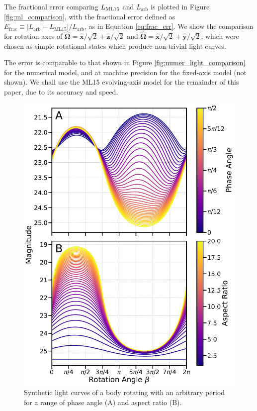 \documentclass[twocolumn,doublespacing]{aastex631}
\begin{document}
The fractional error comparing $L_{{\rm ML15}}$ and $L_\text{arb}$ is plotted in Figure \ref{fig:ml_comparison}, with the fractional error defined as $E_\text{frac}\equiv|L_\text{arb}-L_\text{ML15}|/L_\text{arb}$, as in Equation \ref{eq:frac_err}. We show the comparison for rotation axes of $\boldsymbol{\hat{\Omega}}=\boldsymbol{\hat{x}}/\sqrt{2}+\boldsymbol{\hat{z}}/\sqrt{2}$ and $\boldsymbol{\hat{\Omega}}=\boldsymbol{\hat{x}}/\sqrt{2}+\boldsymbol{\hat{y}}/\sqrt{2}$, which were chosen as simple rotational states which produce non-trivial light curves.

The error is comparable to that shown in Figure \ref{fig:numer_light_comparison} for the numerical model, and at machine precision for the fixed-axis model (not shown). We shall use the ML15 evolving-axis model for the remainder of this paper, due to its accuracy and speed.

\begin{figure}
\centering
\includegraphics[width=\linewidth,angle=0]{ML15_dependence_effects.pdf}
\caption{Synthetic light curves of a body rotating with an arbitrary period for a range of phase angle (A) and aspect ratio (B). }
\label{fig:phaseeffects}
\end{figure}
\end{document}
